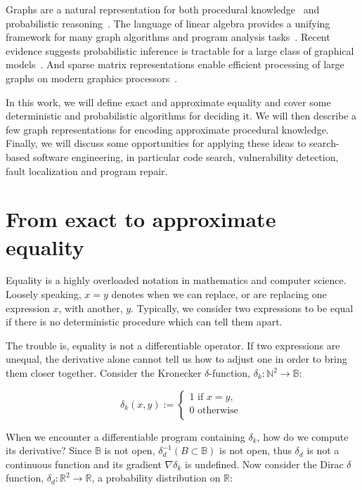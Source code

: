\documentclass[11pt]{article}
\begin{document}
    Graphs are a natural representation for both procedural knowledge~\citep{allamanis2017learning} and probabilistic reasoning~\citep{pearl2014probabilistic}. The language of linear algebra provides a unifying framework for many graph algorithms and program analysis tasks~\citep{kepner2011graph}. Recent evidence suggests probabilistic inference is tractable for a large class of graphical models~\citep{choi2020probabilistic}. And sparse matrix representations enable efficient processing of large graphs on modern graphics processors~\citep{kepner2016mathematical}.

    In this work, we will define exact and approximate equality and cover some deterministic and probabilistic algorithms for deciding it. We will then describe a few graph representations for encoding approximate procedural knowledge. Finally, we will discuss some opportunities for applying these ideas to search-based software engineering, in particular code search, vulnerability detection, fault localization and program repair.


    \section{From exact to approximate equality}\label{sec:definitions}

    Equality is a highly overloaded notation in mathematics and computer science. Loosely speaking, $x = y$ denotes when we can replace, or are replacing one expression $x$, with another, $y$. Typically, we consider two expressions to be equal if there is no deterministic procedure which can tell them apart.

    The trouble is, equality is not a differentiable operator. If two expressions are unequal, the derivative alone cannot tell us how to adjust one in order to bring them closer together. Consider the Kronecker $\delta$-function, $\delta_k: \mathbb{N}^2\rightarrow \mathbb{B}$:

    $$
    \delta_k(x, y) :=
    \begin{cases}
        1 \text{ if } x = y, \\
        0 \text{ otherwise }\\
    \end{cases}
    $$

    When we encounter a differentiable program containing $\delta_k$, how do we compute its derivative? Since $\mathbb{B}$ is not open, $\delta_d^{-1}(B\subset \mathbb{B})$ is not open, thus $\delta_d$ is not a continuous function and its gradient $\nabla\delta_k$ is undefined. Now consider the Dirac $\delta$ function, $\delta_d: \mathbb{R}^2 \rightarrow \mathbb{R}$, a probability distribution on $\mathbb{R}$:
\end{document}
